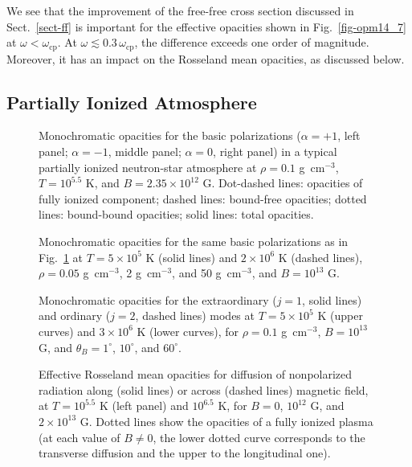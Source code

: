 \documentclass{emulateapj}
\newcommand{\gcc}{\mbox{g cm$^{-3}$}}
\newcommand{\omp}{\omega_\mathrm{cp}}
\begin{document}
We see that the improvement of the free-free cross section
discussed in Sect.\ \ref{sect-ff} is important 
for the effective opacities shown in Fig.\ \ref{fig-opm14_7}
at $\omega<\omp$. At $\omega\lesssim0.3\,\omp$, the difference
exceeds one order of magnitude.
Moreover, it has an impact on the Rosseland mean opacities,
as discussed below.

        \subsection{Partially Ionized Atmosphere}
%
\begin{figure}
\caption{Monochromatic opacities for the basic polarizations
($\alpha=+1$, left panel; $\alpha=-1$, middle panel;
$\alpha=0$, right panel) in a typical 
partially ionized neutron-star atmosphere
at $\rho=0.1$ \gcc, $T=10^{5.5}$ K, and $B=2.35\times10^{12}$ G.
Dot-dashed lines: opacities of fully ionized component;
dashed lines: bound-free opacities;
dotted lines: bound-bound opacities; solid lines: total opacities.
\label{fig-f12_37}}
\end{figure}

\begin{figure}
\caption{Monochromatic opacities for the same basic polarizations
as in Fig.\ \protect\ref{fig-f12_37}
at $T=5\times10^5$ K
(solid lines)
and $2\times10^6$ K (dashed lines),
 $\rho=0.05$ \gcc, 2 \gcc, and 50 \gcc, and $B=10^{13}$ G.
\label{fig-f13_0}}
\end{figure}

\begin{figure}
\caption{Monochromatic opacities for 
the extraordinary ($j=1$, solid lines)
and ordinary ($j=2$, dashed lines) modes 
at $T=5\times10^5$ K (upper curves) and $3\times10^6$ K
(lower curves), for $\rho=0.1$ \gcc, $B=10^{13}$ G,
and $\theta_B=1^\circ$, $10^\circ$, and $60^\circ$.
\label{fig-ang13_0}}
\end{figure}

\begin{figure}
\caption{Effective Rosseland mean opacities for diffusion
of nonpolarized radiation along (solid lines) or across (dashed lines)
magnetic field, at $T=10^{5.5}$ K (left panel)
and $10^{6.5}$ K, for $B=0$, $10^{12}$ G, and $2\times10^{13}$ G.
Dotted lines show the opacities of a fully ionized plasma
(at each value of $B\neq0$, the lower dotted curve corresponds
to the transverse diffusion and the upper to the longitudinal one).
\label{fig-ross}}
\end{figure}
\end{document}
